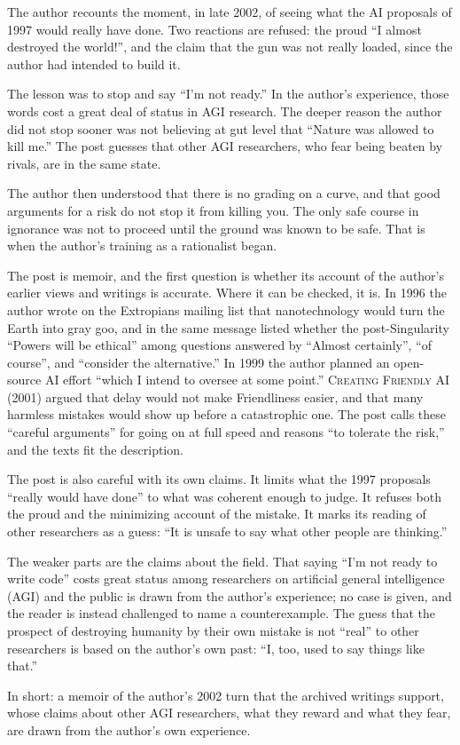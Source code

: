 \begin{afterword}
\summaryhead

The author recounts the moment, in late 2002, of seeing what the AI proposals of 1997 would really have done. Two reactions are refused: the proud ``I almost destroyed the world!'', and the claim that the gun was not really loaded, since the author had intended to build it.

The lesson was to stop and say ``I'm not ready.'' In the author's experience, those words cost a great deal of status in AGI research. The deeper reason the author did not stop sooner was not believing at gut level that ``Nature was allowed to kill me.'' The post guesses that other AGI researchers, who fear being beaten by rivals, are in the same state.

The author then understood that there is no grading on a curve, and that good arguments for a risk do not stop it from killing you. The only safe course in ignorance was not to proceed until the ground was known to be safe. That is when the author's training as a rationalist began.

\responsehead

The post is memoir, and the first question is whether its account of the author's earlier views and writings is accurate. Where it can be checked, it is. In 1996 the author wrote on the Extropians mailing list that nanotechnology would turn the Earth into gray goo, and in the same message listed whether the post-Singularity ``Powers will be ethical'' among questions answered by ``Almost certainly'', ``of course'', and ``consider the alternative.'' In 1999 the author planned an open-source AI effort ``which I intend to oversee at some point.'' \textsc{Creating Friendly AI} (2001) argued that delay would not make Friendliness easier, and that many harmless mistakes would show up before a catastrophic one. The post calls these ``careful arguments'' for going on at full speed and reasons ``to tolerate the risk,'' and the texts fit the description.

The post is also careful with its own claims. It limits what the 1997 proposals ``really would have done'' to what was coherent enough to judge. It refuses both the proud and the minimizing account of the mistake. It marks its reading of other researchers as a guess: ``It is unsafe to say what other people are thinking.''

The weaker parts are the claims about the field. That saying ``I'm not ready to write code'' costs great status among researchers on artificial general intelligence (AGI) and the public is drawn from the author's experience; no case is given, and the reader is instead challenged to name a counterexample. The guess that the prospect of destroying humanity by their own mistake is not ``real'' to other researchers is based on the author's own past: ``I, too, used to say things like that.''

In short: a memoir of the author's 2002 turn that the archived writings support, whose claims about other AGI researchers, what they reward and what they fear, are drawn from the author's own experience.
\end{afterword}
